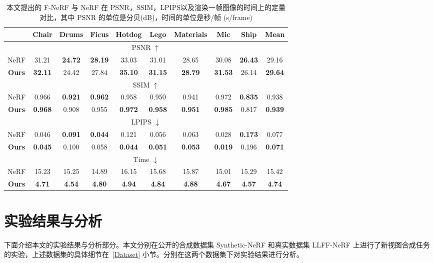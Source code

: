 \begin{table}[t]
	\caption{本文提出的 F-NeRF 与 NeRF 在 PSNR，SSIM，LPIPS以及渲染一帧图像的时间上的定量对比，其中 PSNR 的单位是分贝(\si{dB})，时间的单位是秒/帧 (s/frame)}
	\label{tab:synthetic}
	\centering
	{\small{}\setlength\tabcolsep{6pt}
		\begin{tabular}{cccccccccc}
			\toprule
					
			& Chair & Drums  & Ficus  & Hotdog &  Lego  & Materials & Mic & Ship & Mean\\
			\hline
			\multicolumn{10}{c}{PSNR $ \uparrow$} \\
			\hline
			NeRF   & 31.21	&\textbf{24.72}	&\textbf{28.19}	&33.03	&31.01	&28.65	&30.08	&\textbf{26.43}	&29.16\\
			\textbf{Ours} & \textbf{32.11}	&24.42	&27.84	&\textbf{35.10}	&\textbf{31.15}	&\textbf{28.79}	&\textbf{31.53}	&26.14	&\textbf{29.64}\\
			\hline
			\multicolumn{10}{c}{SSIM $ \uparrow$} \\
			\hline
			NeRF   &0.966	&\textbf{0.921}	&\textbf{0.962}	&0.958	&0.950	&0.941	&0.972	&\textbf{0.835}	&0.938\\
			\textbf{Ours} & \textbf{0.968}	&0.908	&0.955	&\textbf{0.972}	&\textbf{0.958}	&\textbf{0.951}	&\textbf{0.985}	&0.817	&\textbf{0.939}\\
			\hline
			\multicolumn{10}{c}{LPIPS $ \downarrow$}\\
			\hline
			NeRF   & 0.046	&\textbf{0.091}	&\textbf{0.044}	&0.121	&0.056	&0.063	&0.028	&\textbf{0.173}	&0.077\\
			\textbf{Ours} & \textbf{0.045}	&0.100	&0.058	&\textbf{0.044}	&\textbf{0.051}	&\textbf{0.053}	&\textbf{0.019}	&0.196	&\textbf{0.071}\\
			\hline
			\multicolumn{10}{c}{Time $ \downarrow$}\\
			\hline
			NeRF   & 15.23	&15.25	&14.89	&16.15	&15.68	&15.87	&15.01	&15.29	&15.42\\
			\textbf{Ours} & \textbf{4.71}	&\textbf{4.54}	&\textbf{4.80}	&\textbf{4.94}	&\textbf{4.84}	&\textbf{4.88}	&\textbf{4.67}	&\textbf{4.57}	&\textbf{4.74}\\
			\bottomrule
		\end{tabular}
	}
\end{table}

\newpage

\section{实验结果与分析}\label{results}
下面介绍本文的实验结果与分析部分。本文分别在公开的合成数据集 Synthetic-NeRF 和真实数据集 LLFF-NeRF 上进行了新视图合成任务的实验，上述数据集的具体细节在~\ref{Dataset} 小节。分别在这两个数据集下对实验结果进行分析。
